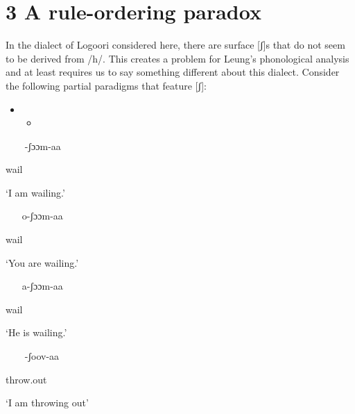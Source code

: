 \documentclass[output=paper]{langsci/langscibook}
\begin{document}
\chapter{3 A rule-ordering paradox}

In the dialect of Logoori considered here, there are surface [ʃ]s that do not seem to be derived from /h/. This creates a problem for Leung’s phonological analysis and at least requires us to say something different about this dialect. Consider the following partial paradigms that feature [ʃ]:

\setcounter{itemize}{0}
\begin{itemize}
\item \setcounter{itemize}{0}
\begin{itemize}
\item \end{itemize}
\end{itemize}
\setcounter{itemize}{0}
\begin{itemize}
\item [-ʃɔɔm-aa]

\end{itemize}

wail  

‘I am wailing.’

\begin{itemize}
\item [o-ʃɔɔm-aa] 

\end{itemize}

wail  

‘You are wailing.’

\begin{itemize}
\item [a-ʃɔɔm-aa] 

\end{itemize}

wail

‘He is wailing.’

\begin{itemize}
\item [-ʃoov-aa]  

\end{itemize}

throw.out 

‘I am throwing out’
\end{document}
